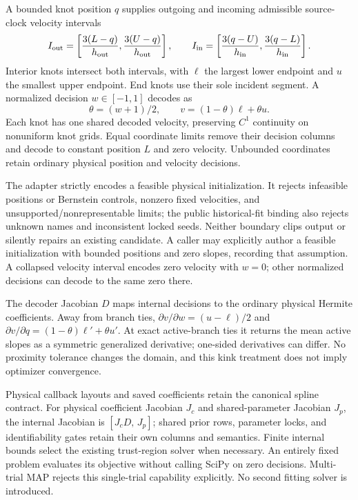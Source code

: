 \documentclass[11pt,letterpaper]{article}
\begin{document}
A bounded knot position $q$ supplies outgoing and incoming admissible
source-clock velocity intervals
\begin{equation}
 I_{\rm out}=\left[\frac{3(L-q)}{h_{\rm out}},
                         \frac{3(U-q)}{h_{\rm out}}\right],\qquad
 I_{\rm in}=\left[\frac{3(q-U)}{h_{\rm in}},
                        \frac{3(q-L)}{h_{\rm in}}\right].
\end{equation}
Interior knots intersect both intervals, with $\ell$ the largest lower
endpoint and $u$ the smallest upper endpoint. End knots use their sole
incident segment. A normalized decision $w\in[-1,1]$ decodes as
\begin{equation}
 \theta=(w+1)/2,\qquad v=(1-\theta)\ell+\theta u.
\end{equation}
Each knot has one shared decoded velocity, preserving $C^1$ continuity on
nonuniform knot grids. Equal coordinate limits remove their decision columns
and decode to constant position $L$ and zero velocity. Unbounded coordinates
retain ordinary physical position and velocity decisions.

The adapter strictly encodes a feasible physical initialization. It rejects
infeasible positions or Bernstein controls, nonzero fixed velocities, and
unsupported/nonrepresentable limits; the public historical-fit binding also
rejects unknown names and inconsistent locked seeds. Neither boundary clips
output or silently repairs an existing candidate. A caller
may explicitly author a feasible initialization with bounded positions and
zero slopes, recording that assumption. A collapsed velocity interval encodes
zero velocity with $w=0$; other normalized decisions can decode to the same
zero there.

The decoder Jacobian $D$ maps internal decisions to the ordinary physical
Hermite coefficients. Away from branch ties,
$\partial v/\partial w=(u-\ell)/2$ and
$\partial v/\partial q=(1-\theta)\ell'+\theta u'$. At exact active-branch
ties it returns the mean active slopes as a symmetric generalized derivative;
one-sided derivatives can differ. No proximity tolerance changes the domain,
and this kink treatment does not imply optimizer convergence.

Physical callback layouts and saved coefficients retain the canonical spline
contract. For physical coefficient Jacobian $J_c$ and shared-parameter
Jacobian $J_p$, the internal Jacobian is $[J_cD,\,J_p]$; shared prior rows,
parameter locks, and identifiability gates retain their own columns and
semantics. Finite internal bounds select the existing trust-region solver
when necessary. An entirely fixed problem evaluates its objective without
calling SciPy on zero decisions. Multi-trial MAP rejects this single-trial
capability explicitly. No second fitting solver is introduced.
\end{document}

